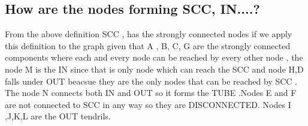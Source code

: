 \documentclass[12pt]{article}
\begin{document}
\subsection{How are the nodes forming SCC, IN....?}
From the above definition SCC , has the strongly connected nodes if we apply this definition to the graph given that A , B, C, G are the strongly connected components where each and every node can be reached by every other node , the node M is the IN since that is only node which can reach the SCC and node H,D falls under OUT beacsue they are the only nodes that can be reached by SCC . The node N connects both IN and OUT so it forms the TUBE .Nodes E and F are not connected to SCC in any way so they are DISCONNECTED. Nodes I ,J,K,L are the OUT tendrils.
\newpage


\cite{*}
\end{document}
